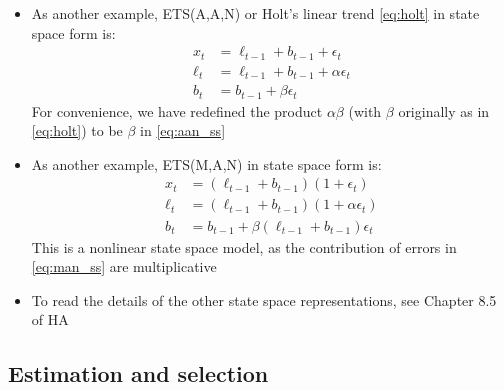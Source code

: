 \documentclass{article}
\begin{document}
\begin{itemize}
\item As another example, ETS(A,A,N) or Holt's linear trend \eqref{eq:holt} in 
  state space form is: 
  \begin{equation}
  \label{eq:aan_ss}
  \begin{aligned}
  x_t &= \ell_{t-1} + b_{t-1} + \epsilon_t \\
  \ell_t &= \ell_{t-1} + b_{t-1} + \alpha \epsilon_t \\
  b_t &= b_{t-1} + \beta \epsilon_t
  \end{aligned}
  \end{equation}
  For convenience, we have redefined the product $\alpha \beta$ (with $\beta$
  originally as in \eqref{eq:holt}) to be $\beta$ in \eqref{eq:aan_ss} 

\item As another example, ETS(M,A,N) in state space form is: 
  \begin{equation}
  \label{eq:man_ss}
  \begin{aligned}
  x_t &= (\ell_{t-1} + b_{t-1})(1 + \epsilon_t) \\
  \ell_t &= (\ell_{t-1} + b_{t-1})(1 + \alpha \epsilon_t) \\
  b_t &= b_{t-1} + \beta (\ell_{t-1} + b_{t-1}) \epsilon_t 
  \end{aligned}
  \end{equation}
  This is a nonlinear state space model, as the contribution of errors in
  \eqref{eq:man_ss} are multiplicative  

\item To read the details of the other state space representations, see Chapter 
  8.5 of HA
\end{itemize}

\subsection{Estimation and selection}
\end{document}
